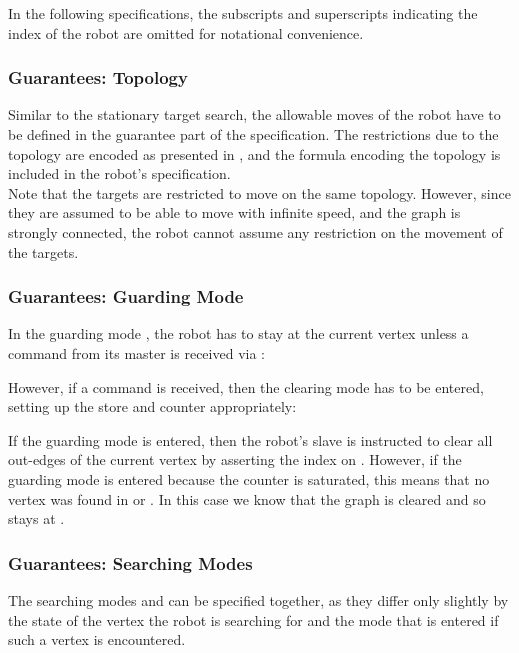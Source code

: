 In the following specifications, the subscripts and superscripts indicating the index of the robot are omitted for notational convenience.\\


\subsubsection{Guarantees: Topology}

Similar to the stationary target search, the allowable moves of the robot have to be defined in the guarantee part of the specification. The restrictions due to the topology are encoded as presented in , and the formula  encoding the topology is included in the robot's specification.\\

Note that the targets are restricted to move on the same topology. However, since they are assumed to be able to move with infinite speed, and the graph is strongly connected, the robot cannot assume any restriction on the movement of the targets.\\


\subsubsection{Guarantees: Guarding Mode}

In the guarding mode , the robot has to stay at the current vertex unless a command from its master is received via :

However, if a command is received, then the clearing mode  has to be entered, setting up the store and counter appropriately:

If the guarding mode is entered, then the robot's slave is instructed to clear all out-edges of the current vertex  by asserting the index  on . However, if the guarding mode is entered because the counter  is saturated, this means that no vertex was found in  or . In this case we know that the graph is cleared and so  stays at .\\



\subsubsection{Guarantees: Searching Modes}

The searching modes  and  can be specified together, as they differ only slightly by the state of the vertex the robot is searching for and the mode that is entered if such a vertex is encountered.\\

